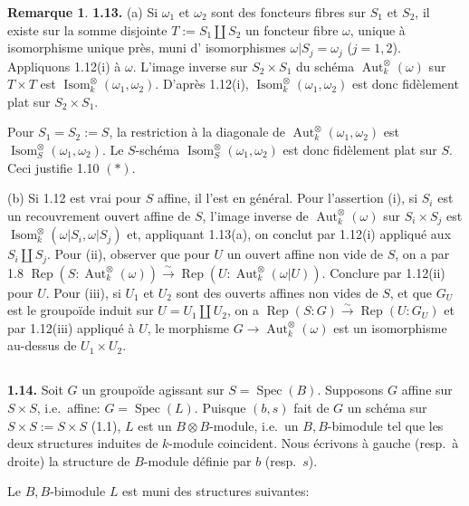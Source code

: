 \documentclass[12pt,a4paper]{article}
\theoremstyle{plain}
\theoremstyle{definition}
\newtheorem{remark}[theorem]{Remarque}
\theoremstyle{remark}
\DeclareMathOperator{\Aut}{Aut}
\DeclareMathOperator{\Isom}{Isom}
\DeclareMathOperator{\Spec}{Spec}
\DeclareMathOperator{\Rep}{Rep}
\begin{document}
\begin{remark}
\textbf{1.13.} (a) Si $\omega_1$ et $\omega_2$ sont des foncteurs fibres sur $S_1$ et $S_2$, il existe sur la somme disjointe $T := S_1 \amalg S_2$ un foncteur fibre $\omega$, unique à isomorphisme unique près, muni d' isomorphismes $\omega|S_j = \omega_j$ ($j = 1,2$). Appliquons 1.12(i) à $\omega$. L'image inverse sur $S_2 \times S_1$ du schéma $\Aut^\otimes_k(\omega)$ sur $T \times T$ est $\Isom^\otimes_k(\omega_1,\omega_2)$. D'après 1.12(i), $\Isom^\otimes_k(\omega_1,\omega_2)$ est donc fidèlement plat sur $S_2 \times S_1$.

Pour $S_1 = S_2 := S$, la restriction à la diagonale de $\Aut^\otimes_k(\omega_1,\omega_2)$ est $\Isom^\otimes_S(\omega_1,\omega_2)$. Le $S$-schéma $\Isom^\otimes_S(\omega_1,\omega_2)$ est donc fidèlement plat sur $S$. Ceci justifie 1.10 $(*)$.

(b) Si 1.12 est vrai pour $S$ affine, il l'est en général. Pour l'assertion (i), si $S_i$ est un recouvrement ouvert affine de $S$, l'image inverse de $\Aut^\otimes_k(\omega)$ sur $S_i \times S_j$ est $\Isom^\otimes_k(\omega|S_i, \omega|S_j)$ et, appliquant 1.13(a), on conclut par 1.12(i) appliqué aux $S_i \amalg S_j$. Pour (ii), observer que pour $U$ un ouvert affine non vide de $S$, on a par 1.8 $\Rep(S:\Aut^\otimes_k(\omega)) \xrightarrow{\sim} \Rep(U:\Aut^\otimes_k(\omega|U))$. Conclure par 1.12(ii) pour $U$. Pour (iii), si $U_1$ et $U_2$ sont des ouverts affines non vides de $S$, et que $G_U$ est le groupoïde induit sur $U = U_1 \amalg U_2$, on a $\Rep(S:G) \xrightarrow{\sim} \Rep(U:G_U)$ et par 1.12(iii) appliqué à $U$, le morphisme $G \to \Aut^\otimes_k(\omega)$ est un isomorphisme au-dessus de $U_1 \times U_2$.
\end{remark}

\subsection{}

\textbf{1.14.} Soit $G$ un groupoïde agissant sur $S = \Spec(B)$. Supposons $G$ affine sur $S \times S$, i.e.~affine: $G = \Spec(L)$. Puisque $(b,s)$ fait de $G$ un schéma sur $S \times S := S \times S$ (1.1), $L$ est un $B \otimes B$-module, i.e.~un $B,B$-bimodule tel que les deux structures induites de $k$-module coincident. Nous écrivons à gauche (resp.~à droite) la structure de $B$-module définie par $b$ (resp.~$s$).

Le $B,B$-bimodule $L$ est muni des structures suivantes:
\end{document}
